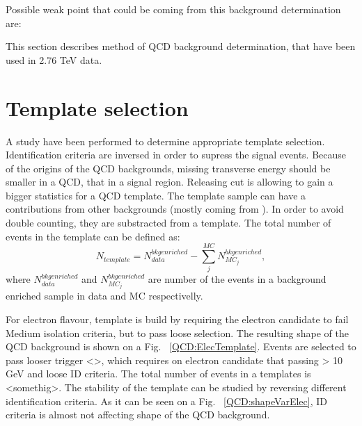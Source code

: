 Possible weak point that could be coming from this background determination are:
\begin{itemize}

\end{itemize}

This section describes method of QCD background determination, that have been used in 2.76 TeV data. 

\section{Template selection}

A study have been performed to determine appropriate template selection. Identification criteria are inversed in order to supress the signal events. Because of the origins of the QCD backgrounds, missing transverse energy \etmiss should be smaller in a QCD, that in a signal region. Releasing \etmiss cut is allowing to gain a bigger statistics for a QCD template.  The template sample can have a contributions from other backgrounds (mostly coming from \wlnu). In order to avoid double counting, they are substracted from a template. The total number of events in the template can be defined as:
\begin{equation}
N_{template} = N^{bkg enriched}_{data} - \sum_{j}^{MC} N_{MC_j}^{bkg enriched},
\end{equation}
where $N^{bkg enriched}_{data}$ and $N_{MC_j}^{bkg enriched}$ are number of the events in a background enriched sample in data and MC respectivelly. 

For electron flavour, template is build by requiring the electron candidate to fail Medium isolation criteria, but to pass loose selection.  The resulting shape of the QCD background is shown on a Fig. ~\ref{QCD:ElecTemplate}. Events are selected to pass looser trigger <>, which requires on electron candidate that passing \pt > 10 GeV and loose ID criteria. 
The total number of events in a templates is <somethig>.  The stability of the template can be studied by reversing different identification criteria. As it can be seen on a Fig. ~\ref{QCD:shapeVarElec}, ID criteria is almost not affecting shape of the QCD background. 

